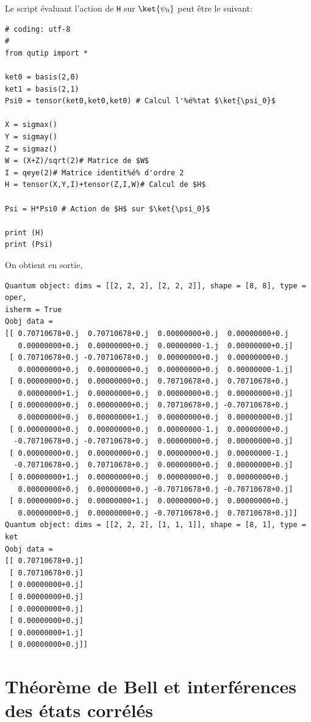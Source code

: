 Le script évaluant l'action de \texttt{H} sur $\ket{\psi_0}$ peut être le 
suivant:\\
\begin{lstlisting}[commentstyle=\scriptsize]
# coding: utf-8 
#
from qutip import *

ket0 = basis(2,0)
ket1 = basis(2,1)
Psi0 = tensor(ket0,ket0,ket0) # Calcul l'%é%tat $\ket{\psi_0}$

X = sigmax()
Y = sigmay()
Z = sigmaz()
W = (X+Z)/sqrt(2)# Matrice de $W$
I = qeye(2)# Matrice identit%é% d'ordre 2
H = tensor(X,Y,I)+tensor(Z,I,W)# Calcul de $H$

Psi = H*Psi0 # Action de $H$ sur $\ket{\psi_0}$

print (H)
print (Psi)
\end{lstlisting}
On obtient en sortie,
\begin{lstlisting}
Quantum object: dims = [[2, 2, 2], [2, 2, 2]], shape = [8, 8], type = oper, 
isherm = True
Qobj data =
[[ 0.70710678+0.j  0.70710678+0.j  0.00000000+0.j  0.00000000+0.j
   0.00000000+0.j  0.00000000+0.j  0.00000000-1.j  0.00000000+0.j]
 [ 0.70710678+0.j -0.70710678+0.j  0.00000000+0.j  0.00000000+0.j
   0.00000000+0.j  0.00000000+0.j  0.00000000+0.j  0.00000000-1.j]
 [ 0.00000000+0.j  0.00000000+0.j  0.70710678+0.j  0.70710678+0.j
   0.00000000+1.j  0.00000000+0.j  0.00000000+0.j  0.00000000+0.j]
 [ 0.00000000+0.j  0.00000000+0.j  0.70710678+0.j -0.70710678+0.j
   0.00000000+0.j  0.00000000+1.j  0.00000000+0.j  0.00000000+0.j]
 [ 0.00000000+0.j  0.00000000+0.j  0.00000000-1.j  0.00000000+0.j
  -0.70710678+0.j -0.70710678+0.j  0.00000000+0.j  0.00000000+0.j]
 [ 0.00000000+0.j  0.00000000+0.j  0.00000000+0.j  0.00000000-1.j
  -0.70710678+0.j  0.70710678+0.j  0.00000000+0.j  0.00000000+0.j]
 [ 0.00000000+1.j  0.00000000+0.j  0.00000000+0.j  0.00000000+0.j
   0.00000000+0.j  0.00000000+0.j -0.70710678+0.j -0.70710678+0.j]
 [ 0.00000000+0.j  0.00000000+1.j  0.00000000+0.j  0.00000000+0.j
   0.00000000+0.j  0.00000000+0.j -0.70710678+0.j  0.70710678+0.j]]
Quantum object: dims = [[2, 2, 2], [1, 1, 1]], shape = [8, 1], type = ket
Qobj data =
[[ 0.70710678+0.j]
 [ 0.70710678+0.j]
 [ 0.00000000+0.j]
 [ 0.00000000+0.j]
 [ 0.00000000+0.j]
 [ 0.00000000+0.j]
 [ 0.00000000+1.j]
 [ 0.00000000+0.j]]
\end{lstlisting}

\section{Théorème de Bell et interférences des états corrélés}
\label{sec:Bell}

